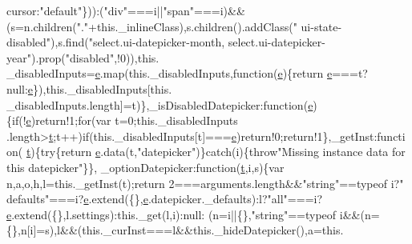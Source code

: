 \begin{DoxyCode}
      cursor:\textcolor{stringliteral}{"default"}\})):(\textcolor{stringliteral}{"div"}===i||\textcolor{stringliteral}{"span"}===i)&&(s=n.children(\textcolor{stringliteral}{"."}+this.\_inlineClass),s.children().addClass(\textcolor{stringliteral}{"
      ui-state-disabled"}),s.find(\textcolor{stringliteral}{"select.ui-datepicker-month, select.ui-datepicker-year"}).prop(\textcolor{stringliteral}{"disabled"},!0)),this.
      \_disabledInputs=\hyperlink{jquery-ui_8min_8js_a2c038346d47955cbe2cb91e338edd7e1}{e}.map(this.\_disabledInputs,function(\hyperlink{jquery-ui_8min_8js_a2c038346d47955cbe2cb91e338edd7e1}{e})\{\textcolor{keywordflow}{return} \hyperlink{jquery-ui_8min_8js_a2c038346d47955cbe2cb91e338edd7e1}{e}===t?null:\hyperlink{jquery-ui_8min_8js_a2c038346d47955cbe2cb91e338edd7e1}{e}\}),this.\_disabledInputs[this.
      \_disabledInputs.length]=t)\},\_isDisabledDatepicker:\textcolor{keyword}{function}(\hyperlink{jquery-ui_8min_8js_a2c038346d47955cbe2cb91e338edd7e1}{e})\{\textcolor{keywordflow}{if}(!\hyperlink{jquery-ui_8min_8js_a2c038346d47955cbe2cb91e338edd7e1}{e})\textcolor{keywordflow}{return}!1;\textcolor{keywordflow}{for}(var t=0;this.\_disabledInputs
      .length>\hyperlink{jquery-2_80_83_8min_8js_aaccc9105df5383111407fd5b41255e23}{t};t++)\textcolor{keywordflow}{if}(this.\_disabledInputs[t]===\hyperlink{jquery-ui_8min_8js_a2c038346d47955cbe2cb91e338edd7e1}{e})\textcolor{keywordflow}{return}!0;\textcolor{keywordflow}{return}!1\},\_getInst:\textcolor{keyword}{function}(
      \hyperlink{jquery-2_80_83_8min_8js_aaccc9105df5383111407fd5b41255e23}{t})\{\textcolor{keywordflow}{try}\{\textcolor{keywordflow}{return} \hyperlink{jquery-ui_8min_8js_a2c038346d47955cbe2cb91e338edd7e1}{e}.data(t,\textcolor{stringliteral}{"datepicker"})\}\textcolor{keywordflow}{catch}(i)\{\textcolor{keywordflow}{throw}\textcolor{stringliteral}{"Missing instance data for this datepicker"}\}\},
      \_optionDatepicker:\textcolor{keyword}{function}(\hyperlink{jquery-2_80_83_8min_8js_aaccc9105df5383111407fd5b41255e23}{t},i,s)\{var n,a,o,h,l=this.\_getInst(t);\textcolor{keywordflow}{return} 2===arguments.length&&\textcolor{stringliteral}{"string"}==typeof i?\textcolor{stringliteral}{"
      defaults"}===i?\hyperlink{jquery-ui_8min_8js_a2c038346d47955cbe2cb91e338edd7e1}{e}.extend(\{\},\hyperlink{jquery-ui_8min_8js_a2c038346d47955cbe2cb91e338edd7e1}{e}.datepicker.\_defaults):l?\textcolor{stringliteral}{"all"}===i?\hyperlink{jquery-ui_8min_8js_a2c038346d47955cbe2cb91e338edd7e1}{e}.extend(\{\},l.settings):this.\_get(l,i):null:
      (n=i||\{\},\textcolor{stringliteral}{"string"}==typeof i&&(n=\{\},n[i]=s),l&&(this.\_curInst===l&&this.\_hideDatepicker(),a=this.

\end{DoxyCode}

